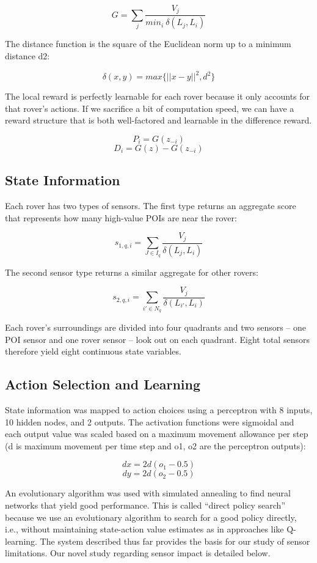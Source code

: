 \documentclass[letterpaper, 10 pt, conference]{ieeeconf}  %
\begin{document}
\[
G= \sum_j  \frac{V_j}{min_i \: \delta(L_j, L_i)}
\]

The distance function is the square of the Euclidean norm up to a
minimum distance d2:

\[
\delta  (x,y) = max \big\{||x - y||^2, d^2 \big\}    
\]

The local reward is perfectly learnable for each rover because it only accounts for that rover's actions. If we sacrifice a bit of computation speed, we can have a reward structure that is both well-factored and learnable in the difference reward.

\[
P_i=G(z_{-i})
\]
\[
D_i=G(z)-G(z_{-i})
\]

\subsection{State Information}
Each rover has two types of sensors. The first type returns an
aggregate score that represents how many high-value POIs are near the
rover:

\[
s_{1,q,i} =  \sum_{J \in I_q}  \frac{V_j}{\delta (L_j, L_i)} 
\]

The second sensor type returns a similar aggregate for other rovers:

\[
s_{2,q,i} =  \sum_{i' \in N_q}  \frac{V_j}{\delta (L_{i'}, L_i)}  
\]

Each rover’s surroundings are divided into four quadrants and two
sensors -- one POI sensor and one rover sensor -- look out on each
quadrant. Eight total sensors therefore yield eight continuous state
variables.

\subsection{Action Selection and Learning}
State information was mapped to action choices using a perceptron with
8 inputs, 10 hidden nodes, and 2 outputs. The activation functions
were sigmoidal and each output value was scaled based on a maximum
movement allowance per step (d is maximum movement per time step and
o1, o2 are the perceptron outputs):

\[
dx = 2d(o_1-0.5)
\]
\[
dy = 2d(o_2-0.5)
\]

An evolutionary algorithm was used with simulated annealing to find
neural networks that yield good performance. This is called “direct
policy search” because we use an evolutionary algorithm to search for
a good policy directly, i.e., without maintaining state-action value
estimates as in approaches like Q-learning. The system described thus
far provides the basis for our study of sensor limitations. Our novel
study regarding sensor impact is detailed below.
\end{document}
